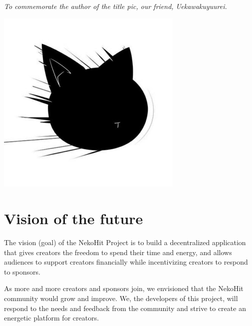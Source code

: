 \documentclass[12pt,a4paper]{article}
\begin{document}

    \thispagestyle{empty}
    \vspace*{\fill}
    \begin{center}
        \textit{To commemorate the author of the title pic, our friend, Uekawakuyuurei.}
    \end{center}
    \vspace*{\fill}
    \clearpage

    \tableofcontents
    \vspace*{\fill}
    \begin{center}
        \includegraphics[width=0.67\textwidth]{assets/img197}
    \end{center}
    \clearpage



    \section{Vision of the future}\label{sec:goal}

    The vision (goal) of the NekoHit Project is to build a decentralized
    application that gives creators the freedom to spend their time and energy,
    and allows audiences to support creators financially while incentivizing
    creators to respond to sponsors.

    As more and more creators and sponsors join, we envisioned that the NekoHit
    community would grow and improve.
    We, the developers of this project, will respond to the needs and feedback
    from the community and strive to create an energetic platform for creators.
\end{document}
